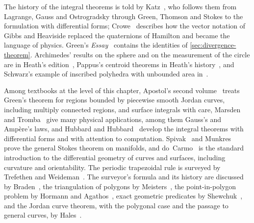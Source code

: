 \chapternotes

The history of the integral theorems is told by Katz~\cite{katz1979}, who follows them from Lagrange, Gauss and Ostrogradsky through Green, Thomson and Stokes to the formulation with differential forms; Crowe~\cite{crowe1967} describes how the vector notation of Gibbs and Heaviside replaced the quaternions of Hamilton and became the language of physics. Green's \emph{Essay}~\cite{green1828} contains the identities of \cref{sec:divergence-theorem}. Archimedes' results on the sphere and on the measurement of the circle are in Heath's edition~\cite{heath1897archimedes}, Pappus's centroid theorems in Heath's history~\cite{heath1921}, and Schwarz's example of inscribed polyhedra with unbounded area in~\cite{schwarz1890}.

Among textbooks at the level of this chapter, Apostol's second volume~\cite{apostol1969calculus} treats Green's theorem for regions bounded by piecewise smooth Jordan curves, including multiply connected regions, and surface integrals with care, Marsden and Tromba~\cite{marsden2012vector} give many physical applications, among them Gauss's and Amp\`ere's laws, and Hubbard and Hubbard~\cite{hubbard2015vector} develop the integral theorems with differential forms and with attention to computation. Spivak~\cite{spivak1965manifolds} and Munkres~\cite{munkres1991} prove the general Stokes theorem on manifolds, and do~Carmo~\cite{docarmo1976} is the standard introduction to the differential geometry of curves and surfaces, including curvature and orientability. The periodic trapezoidal rule is surveyed by Trefethen and Weideman~\cite{trefethen2014}. The surveyor's formula and its history are discussed by Braden~\cite{braden1986}, the triangulation of polygons by Meisters~\cite{meisters1975}, the point-in-polygon problem by Hormann and Agathos~\cite{hormann2001}, exact geometric predicates by Shewchuk~\cite{shewchuk1997}, and the Jordan curve theorem, with the polygonal case and the passage to general curves, by Hales~\cite{hales2007}.

\chapterreferences
